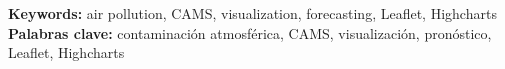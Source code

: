 \pagebreak
\cleardoublepage
{} \label{Index}
\markboth{\indexname}{\indexname}
\printindex
\vfill

\textbf{Keywords:} air pollution, CAMS, visualization, forecasting, Leaflet, Highcharts
\textbf{Palabras clave:} contaminación atmosférica, CAMS, visualización, pronóstico, Leaflet, Highcharts